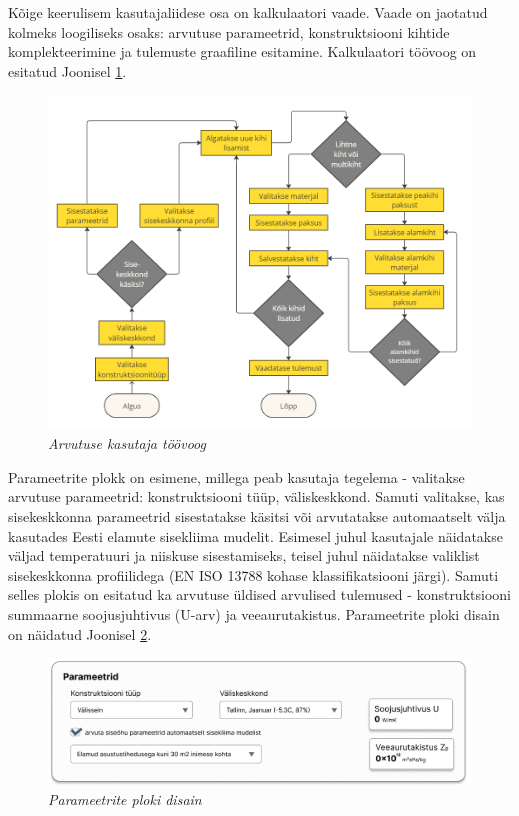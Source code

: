 Kõige keerulisem kasutajaliidese osa on kalkulaatori vaade. Vaade on jaotatud kolmeks loogiliseks osaks:
arvutuse parameetrid, konstruktsiooni kihtide komplekteerimine ja tulemuste graafiline esitamine. 
Kalkulaatori töövoog on esitatud Joonisel \ref{fig:desing_workflow}.
\begin{figure}[ht]
    \centering
    \includegraphics[width=1\textwidth]{figures/analysis/desing_workflow.png}
    \caption[Arvutuse kasutaja töövoog]{\textit{Arvutuse kasutaja töövoog}}
    \label{fig:desing_workflow}
\end{figure}

Parameetrite plokk on esimene, millega peab kasutaja tegelema 
- valitakse arvutuse parameetrid: konstruktsiooni tüüp, väliskeskkond. Samuti valitakse, kas 
sisekeskkonna parameetrid sisestatakse käsitsi või arvutatakse automaatselt välja kasutades 
Eesti elamute sisekliima mudelit. Esimesel juhul kasutajale näidatakse väljad temperatuuri ja 
niiskuse sisestamiseks, teisel juhul näidatakse valiklist sisekeskkonna profiilidega (EN ISO 13788 kohase
klassifikatsiooni järgi).  Samuti selles plokis on esitatud ka arvutuse üldised arvulised tulemused -
konstruktsiooni summaarne soojusjuhtivus (U-arv) ja veeaurutakistus. Parameetrite ploki disain
on näidatud Joonisel \ref{fig:design_calc_parameters}.
\begin{figure}[ht]
    \centering
    \includegraphics[width=1\textwidth]{figures/analysis/desing_calc_parameters.png}
    \caption[Parameetrite ploki disain]{\textit{Parameetrite ploki disain}}
    \label{fig:design_calc_parameters}
\end{figure}

